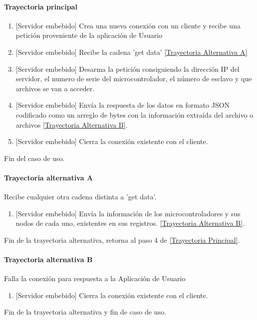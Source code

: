 \begin{longtable}{|J{5cm}|J{10.3cm}|}
\end{longtable}

\paragraph{Trayectoria principal}
\label{SUB-M-CU1.10:TP}
	\begin{enumerate}
		\item {[Servidor embebido]} Crea una nueva conexión con un cliente y recibe una petición proveniente de la aplicación de Usuario
		
		\item {[Servidor embebido]} Recibe la cadena 'get data'
		\hyperref[SUB-M-CU1.4:TA]{[Trayectoria Alternativa A]}
		
		\item {[Servidor embebido]} Desarma la petición consiguiendo la dirección IP del servidor, el numero de serie del microcontrolador, el número de esclavo y que archivos se van a acceder.
		
		\item {[Servidor embebido]} Envía la respuesta de los datos en formato JSON codificado como un arreglo de bytes con la información extraída del archivo o archivos \hyperref[SUB-M-CU1.10:TB]{[Trayectoria Alternativa B]}.
		
		\item {[Servidor embebido]} Cierra la conexión existente con el cliente.
	
	\end{enumerate}
	Fin del caso de uso.

\paragraph{Trayectoria alternativa A} \label{SUB-M-CU1.10:TA}
	Recibe cualquier otra cadena distinta a 'get data'.
	\begin{enumerate}[label=A\arabic*.]
		\item {[Servidor embebido]} Envía la información de los microcontroladores y sus nodos de cada uno, existentes en sus registros.
		\hyperref[SUB-M-CU1.10:TB]{[Trayectoria Alternativa B]}.
	\end{enumerate}
	Fin de la trayectoria alternativa, retorna al paso 4 de  \hyperref[SUB-M-CU1.10:TP]{[Trayectoria Principal]}.
	
\paragraph{Trayectoria alternativa B} \label{SUB-M-CU1.10:TB}
	Falla la conexión para respuesta a la Aplicación de Usuario
	\begin{enumerate}[label=B\arabic*.]
		\item {[Servidor embebido]} Cierra la conexión existente con el cliente.
	\end{enumerate}
	Fin de la trayectoria alternativa y fin de caso de uso.
